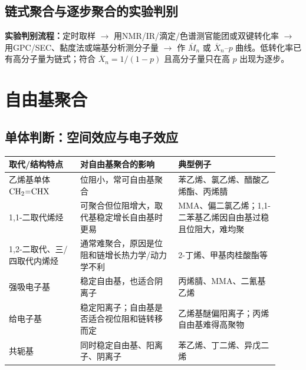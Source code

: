 \documentclass[UTF8,a4paper,10pt,twocolumn]{ctexart}
\newcommand{\Mn}{\overline{M}_n}
\newcommand{\Xn}{\overline{X}_n}
\begin{document}
\subsection{链式聚合与逐步聚合的实验判别}
\begin{center}
\end{center}
\textbf{实验判别流程：}定时取样 $\to$ 用NMR/IR/滴定/色谱测官能团或双键转化率 $\to$ 用GPC/SEC、黏度法或端基分析测分子量 $\to$ 作 $\Mn$ 或 $\Xn$--$p$ 曲线。低转化率已有高分子量为链式；符合 $\Xn=1/(1-p)$ 且高分子量只在高 $p$ 出现为逐步。

\section{自由基聚合}
\subsection{单体判断：空间效应与电子效应}
\begin{center}
  \scriptsize
  \begin{tabularx}{\linewidth}{p{0.24\linewidth}p{0.33\linewidth}p{0.34\linewidth}}
    \toprule
    取代/结构特点              & 对自由基聚合的影响                & 典型例子                              \\
    \midrule
    乙烯基单体 $\ce{CH2=CHX}$ & 位阻小，常可自由基聚合              & 苯乙烯、氯乙烯、醋酸乙烯酯、丙烯腈                 \\
    1,1-二取代烯烃            & 可聚合但位阻增大，取代基稳定增长自由基时更易   & MMA、偏二氯乙烯；1,1-二苯基乙烯因自由基过稳且位阻大，难均聚 \\
    1,2-二取代、三/四取代内烯烃     & 通常难聚合，原因是位阻和链增长热力学/动力学不利 & 2-丁烯、甲基肉桂酸酯等                      \\
    强吸电子基                & 稳定自由基，也适合阴离子             & 丙烯腈、MMA、二氰基乙烯                     \\
    给电子基                 & 稳定阳离子；自由基是否适合视位阻和链转移而定   & 乙烯基醚偏阳离子；丙烯自由基难得高聚物               \\
    共轭基                  & 同时稳定自由基、阳离子、阴离子          & 苯乙烯、丁二烯、异戊二烯                      \\
    \bottomrule
  \end{tabularx}
\end{center}
\end{document}
